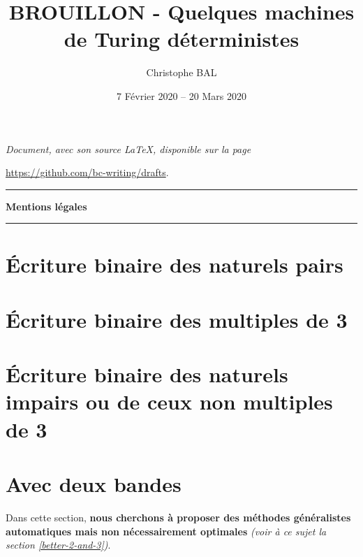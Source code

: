 \documentclass[a4paper, 12pt]{scrartcl}
\begin{document}
\title{BROUILLON - Quelques machines de Turing déterministes}
\author{Christophe BAL}
\date{7 Février 2020 -- 20 Mars 2020}

\maketitle

\begin{center}
	\itshape
	Document, avec son source \LaTeX, disponible sur la page
	
	\url{https://github.com/bc-writing/drafts}.
\end{center}


\bigskip


\begin{center}
	\hrule\vspace{.3em}
	{
		\fontsize{1.35em}{1em}\selectfont
		\textbf{Mentions \og légales \fg}
	}
			
	\vspace{0.45em}
	\doclicenseThis
	\hrule
\end{center}


\bigskip
\setcounter{tocdepth}{2}
\tableofcontents



\newpage
\section{Écriture binaire des naturels pairs}

	


\newpage
\section{Écriture binaire des multiples de 3} \label{divisibility-by-3}

	


\newpage
\section{Écriture binaire des naturels impairs ou de ceux non multiples de 3}

	


\newpage
\section{Avec deux bandes}

	Dans cette section, \textbf{nous cherchons à proposer des méthodes généralistes automatiques mais non nécessairement optimales}
	\emph{(voir à ce sujet la section \ref{better-2-and-3})}.
\end{document}
